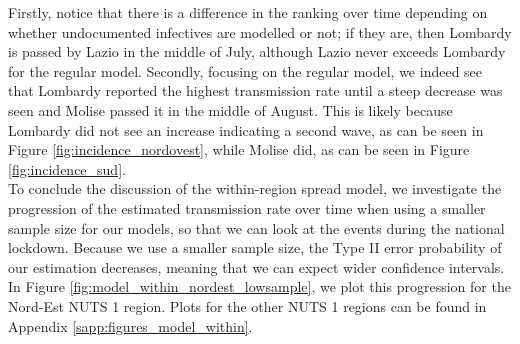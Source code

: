 \documentclass[12pt]{article}
\begin{document}
	Firstly, notice that there is a difference in the ranking over time depending on whether undocumented infectives are modelled or not; if they are, then Lombardy is passed by Lazio in the middle of July, although Lazio never exceeds Lombardy for the regular model. Secondly, focusing on the regular model, we indeed see that Lombardy reported the highest transmission rate until a steep decrease was seen and Molise passed it in the middle of August. This is likely because Lombardy did not see an increase indicating a second wave, as can be seen in Figure \ref{fig:incidence_nordovest}, while Molise did, as can be seen in Figure \ref{fig:incidence_sud}.
	\\
	
	To conclude the discussion of the within-region spread model, we investigate the progression of the estimated transmission rate over time when using a smaller sample size for our models, so that we can look at the events during the national lockdown. Because we use a smaller sample size, the Type II error probability of our estimation decreases, meaning that we can expect wider confidence intervals. In Figure \ref{fig:model_within_nordest_lowsample}, we plot this progression for the Nord-Est NUTS 1 region. Plots for the other NUTS 1 regions can be found in Appendix \ref{sapp:figures_model_within}.
	
\end{document}
